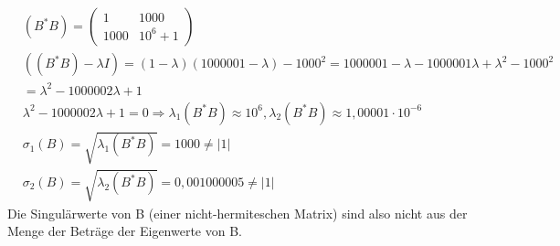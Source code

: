 \begin{align*}
&(B^*B)=
\begin{pmatrix}
1 & 1000\\
1000 & 10^6+1
\end{pmatrix}\\
&((B^*B)-\lambda I)=(1-\lambda)(1000001-\lambda)-1000^2=1000001-\lambda-1000001\lambda+\lambda^2-1000^2\\ &=\lambda^2-1000002\lambda+1\\
&\lambda^2-1000002\lambda+1=0 \Rightarrow \lambda_{1}(B^*B)\approx 10^6, \lambda_{2}(B^*B) \approx 1,00001\cdot 10^{-6}\\
&\sigma_1(B)=\sqrt{\lambda_1(B^*B)}=1000 \neq |1|\\
&\sigma_2(B)=\sqrt{\lambda_2(B^*B)}=0,001000005 \neq|1|
\end{align*}
Die Singulärwerte von B (einer nicht-hermiteschen Matrix) sind also nicht aus der Menge der Beträge der Eigenwerte von B.